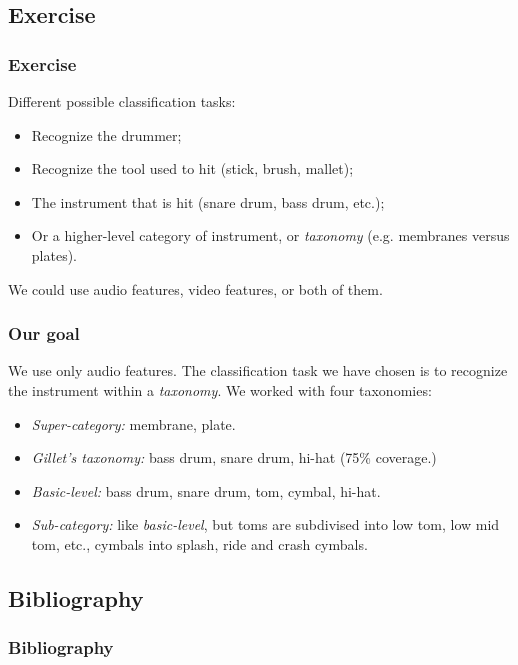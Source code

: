 \documentclass{beamer}
\begin{document}
    \subsection{Exercise}
    \begin{frame}
        \frametitle{Exercise}
        Different possible classification tasks:
        \begin{itemize}
            \item Recognize the drummer;
            \item Recognize the tool used to hit (stick, brush, mallet);
            \item The instrument that is hit (snare drum, bass drum, etc.);
            \item Or a higher-level category of instrument, or \emph{taxonomy} (e.g. membranes versus plates).
        \end{itemize}
        We could use audio features, video features, or both of them.
    \end{frame}
    
    \begin{frame}
        \frametitle{Our goal}
        We use only audio features. The classification task we have chosen is to recognize the instrument within a \emph{taxonomy}. We worked with four taxonomies:
        \begin{itemize}

            \item \emph{Super-category:} membrane, plate.
            \item \emph{Gillet's taxonomy:} bass drum, snare drum, hi-hat (75\% coverage.)
            \item \emph{Basic-level:} bass drum, snare drum, tom, cymbal, hi-hat.
            \item \emph{Sub-category:} like \emph{basic-level}, but toms are subdivised into low tom, low mid tom, etc., cymbals into splash, ride and crash cymbals.
        \end{itemize}
    \end{frame}
    
    \subsection{Bibliography}
    \begin{frame}
        \frametitle{Bibliography}
        {\fontsize{0.8em}{1em}
        \nocite{*}
        
        }
    \end{frame}
\end{document}
